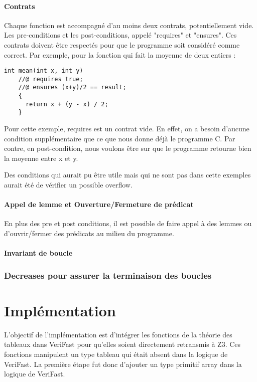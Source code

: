 \documentclass[9pt]{book}
\newcommand{\verifast}{VeriFast}
\begin{document}
		\subsubsection{Contrats}
			Chaque fonction est accompagn\'e d'au moins deux contrats, potentiellement vide. Les pre-conditions et les post-conditions, appel\'e "requires" et "ensures". Ces contrats doivent \^etre respect\'es pour que le programme soit consid\'er\'e comme correct. Par exemple, pour la fonction qui fait la moyenne de deux entiers :
			\begin{lstlisting}
int mean(int x, int y)
	//@ requires true;
	//@ ensures (x+y)/2 == result;
	{
	  return x + (y - x) / 2;
	}
			\end{lstlisting}
	Pour cette exemple, requires est un contrat vide. En effet, on a besoin d'aucune condition suppl\'ementaire que ce que nous donne d\'ej\`a le programme C. Par contre, en post-condition, nous voulons \^etre sur que le programme retourne bien la moyenne entre x et y.\par
	Des conditions qui aurait pu \^etre utile mais qui ne sont pas dans cette exemples aurait \'et\'e de v\'erifier un possible overflow.
		\subsubsection{Appel de lemme et Ouverture/Fermeture de pr\'edicat}
			En plus des pre et post conditions, il est possible de faire appel \`a des lemmes ou d'ouvrir/fermer des pr\'edicats au milieu du programme.
		\subsubsection{Invariant de boucle}

		\subsection{Decreases pour assurer la terminaison des boucles}

\chapter{Impl\'ementation}
	L'objectif de l'impl\'ementation est d'int\'egrer les fonctions de la th\'eorie des tableaux dans \verifast{} pour qu'elles soient directement retransmis \`a Z3. Ces fonctions manipulent un type tableau qui \'etait absent dans la logique de \verifast{}. La premi\`ere \'etape fut donc d'ajouter un type primitif array dans la logique de \verifast{}.
\end{document}
